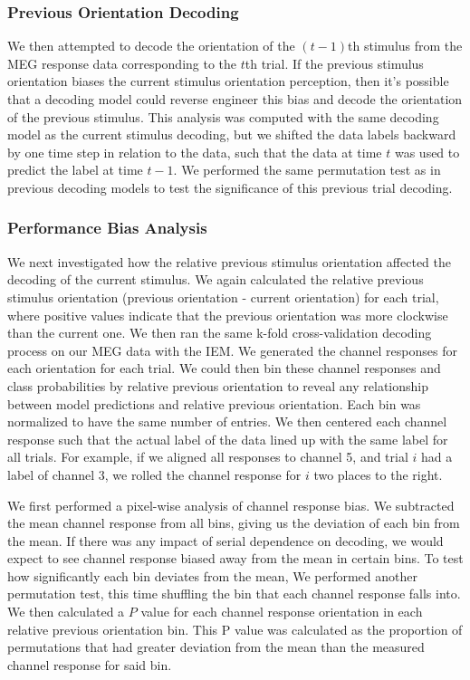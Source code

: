 \documentclass[../main.tex]{subfiles}
\begin{document}
\subsubsection{Previous Orientation Decoding}
We then attempted to decode the orientation of the $(t-1)$th stimulus from the MEG response data corresponding to the $t$th trial. If the previous stimulus orientation biases the current stimulus orientation perception, then it's possible that a decoding model could reverse engineer this bias and decode the orientation of the previous stimulus. This analysis was computed with the same decoding model as the current stimulus decoding, but we shifted the data labels backward by one time step in relation to the data, such that the data at time $t$ was used to predict the label at time $t - 1$. We performed the same permutation test as in previous decoding models to test the significance of this previous trial decoding.

\subsubsection{Performance Bias Analysis}
We next investigated how the relative previous stimulus orientation affected the decoding of the current stimulus. We again calculated the relative previous stimulus orientation (previous orientation - current orientation) for each trial, where positive values indicate that the previous orientation was more clockwise than the current one. We then ran the same k-fold cross-validation decoding process on our MEG data with the IEM. We generated the channel responses for each orientation for each trial. We could then bin these channel responses and class probabilities by relative previous orientation to reveal any relationship between model predictions and relative previous orientation. Each bin was normalized to have the same number of entries. We then centered each channel response such that the actual label of the data lined up with the same label for all trials. For example, if we aligned all responses to channel 5, and trial $i$ had a label of channel 3, we rolled the channel response for $i$ two places to the right. 

We first performed a pixel-wise analysis of channel response bias. We subtracted the mean channel response from all bins, giving us the deviation of each bin from the mean. If there was any impact of serial dependence on decoding, we would expect to see channel response biased away from the mean in certain bins. To test how significantly each bin deviates from the mean, We performed another permutation test, this time shuffling the bin that each channel response falls into. We then calculated a $P$ value for each channel response orientation in each relative previous orientation bin. This P value was calculated as the proportion of permutations that had greater deviation from the mean than the measured channel response for said bin.
\end{document}
